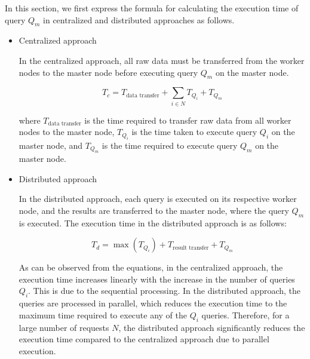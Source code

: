 \documentclass[5p,times]{elsarticle}
\begin{document}
In this section, we first express the formula for calculating the execution time of query $Q_m$ in centralized and distributed approaches as follows.


\begin{itemize}

\item Centralized approach


In the centralized approach, all raw data must be transferred from the worker nodes to the master node before executing query \( Q_m \) on the master node.

\begin{equation}
T_c = T_{\text{data transfer}} + \sum_{i \in N} T_{Q_i} + T_{Q_m}
\end{equation}

where \( T_{\text{data transfer}} \) is the time required to transfer raw data from all worker nodes to the master node, \( T_{Q_i} \) is the time taken to execute query \( Q_i \) on the master node, and \( T_{Q_m} \) is the time required to execute query \( Q_m \) on the master node.

\item Distributed approach

In the distributed approach, each query is executed on its respective worker node, and the results are transferred to the master node, where the query \( Q_m \) is executed. The execution time in the distributed approach is as follows:

\begin{equation}
T_d = \max(T_{Q_i}) + T_{\text{result transfer}} + T_{Q_m}
\end{equation}

As can be observed from the equations, in the centralized approach, the execution time increases linearly with the increase in the number of queries \( Q_i \). This is due to the sequential processing. In the distributed approach, the queries are processed in parallel, which reduces the execution time to the maximum time required to execute any of the \( Q_i \) queries. Therefore, for a large number of requests \( N \), the distributed approach significantly reduces the execution time compared to the centralized approach due to parallel execution.



\end{itemize}
\end{document}
